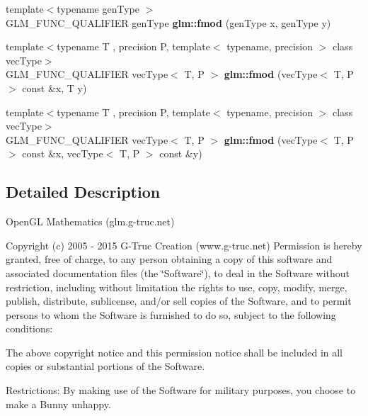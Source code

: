 \begin{DoxyCompactItemize}
\item 
\hypertarget{namespaceglm_a823bda2877e4dcc4440987f94e0e3690}{{\footnotesize template$<$typename gen\-Type $>$ }\\G\-L\-M\-\_\-\-F\-U\-N\-C\-\_\-\-Q\-U\-A\-L\-I\-F\-I\-E\-R gen\-Type {\bfseries glm\-::fmod} (gen\-Type x, gen\-Type y)}\label{namespaceglm_a823bda2877e4dcc4440987f94e0e3690}

\item 
\hypertarget{namespaceglm_a8f5595207b335bcff3fa45a6f4a7767e}{{\footnotesize template$<$typename T , precision P, template$<$ typename, precision $>$ class vec\-Type$>$ }\\G\-L\-M\-\_\-\-F\-U\-N\-C\-\_\-\-Q\-U\-A\-L\-I\-F\-I\-E\-R vec\-Type$<$ T, P $>$ {\bfseries glm\-::fmod} (vec\-Type$<$ T, P $>$ const \&x, T y)}\label{namespaceglm_a8f5595207b335bcff3fa45a6f4a7767e}

\item 
\hypertarget{namespaceglm_aa23aa36dcfb6be51d71310412fdedfd1}{{\footnotesize template$<$typename T , precision P, template$<$ typename, precision $>$ class vec\-Type$>$ }\\G\-L\-M\-\_\-\-F\-U\-N\-C\-\_\-\-Q\-U\-A\-L\-I\-F\-I\-E\-R vec\-Type$<$ T, P $>$ {\bfseries glm\-::fmod} (vec\-Type$<$ T, P $>$ const \&x, vec\-Type$<$ T, P $>$ const \&y)}\label{namespaceglm_aa23aa36dcfb6be51d71310412fdedfd1}

\end{DoxyCompactItemize}


\subsection{Detailed Description}
Open\-G\-L Mathematics (glm.\-g-\/truc.\-net)

Copyright (c) 2005 -\/ 2015 G-\/\-Truc Creation (www.\-g-\/truc.\-net) Permission is hereby granted, free of charge, to any person obtaining a copy of this software and associated documentation files (the \char`\"{}\-Software\char`\"{}), to deal in the Software without restriction, including without limitation the rights to use, copy, modify, merge, publish, distribute, sublicense, and/or sell copies of the Software, and to permit persons to whom the Software is furnished to do so, subject to the following conditions\-:

The above copyright notice and this permission notice shall be included in all copies or substantial portions of the Software.

Restrictions\-: By making use of the Software for military purposes, you choose to make a Bunny unhappy.

